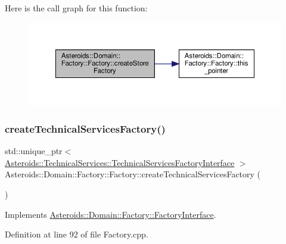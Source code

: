 Here is the call graph for this function\+:\nopagebreak
\begin{figure}[H]
\begin{center}
\leavevmode
\includegraphics[width=350pt]{classAsteroids_1_1Domain_1_1Factory_1_1Factory_abc6cc7d441ceeca66671c79cff1e0c99_cgraph}
\end{center}
\end{figure}
\mbox{\label{classAsteroids_1_1Domain_1_1Factory_1_1Factory_a8ea28b3c5b9c351eb49ac2f97786b7b1}} 
\subsubsection{\texorpdfstring{create\+Technical\+Services\+Factory()}{createTechnicalServicesFactory()}}
{\footnotesize\ttfamily std\+::unique\+\_\+ptr$<$ \hyperlink{classAsteroids_1_1TechnicalServices_1_1TechnicalServicesFactoryInterface}{Asteroids\+::\+Technical\+Services\+::\+Technical\+Services\+Factory\+Interface} $>$ Asteroids\+::\+Domain\+::\+Factory\+::\+Factory\+::create\+Technical\+Services\+Factory (\begin{DoxyParamCaption}{ }\end{DoxyParamCaption})\hspace{0.3cm}{\ttfamily [virtual]}}



Implements \hyperlink{classAsteroids_1_1Domain_1_1Factory_1_1FactoryInterface_a9b67997dd9975091acd7f407e2aa71b1}{Asteroids\+::\+Domain\+::\+Factory\+::\+Factory\+Interface}.



Definition at line 92 of file Factory.\+cpp.

\mbox{\label{classAsteroids_1_1Domain_1_1Factory_1_1Factory_acb69fddf282eda975e582394dde7e7f6}} 
